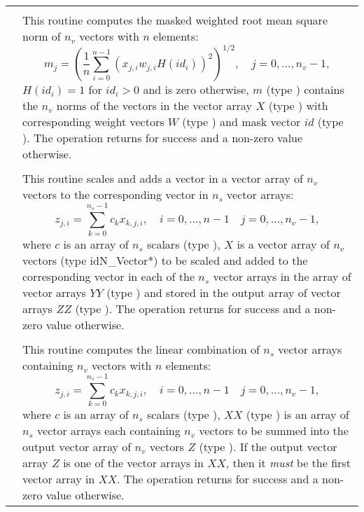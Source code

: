 \begin{xtabular}{|p{\colonec}|p{\coltwoc}|}
 &  \\
& This routine computes the masked weighted root mean square norm of $n_v$
vectors with $n$ elements:
\begin{equation*}
m_j = \left( \frac1n \sum_{i=0}^{n-1} \left(x_{j,i} w_{j,i}
H(id_i)\right)^2 \right)^{1/2}, \quad j=0,\ldots,n_v-1,
\end{equation*}
$H(id_i)=1$ for $id_i > 0$ and is zero otherwise, $m$ (type ) contains
the $n_v$ norms of the vectors in the vector array $X$ (type ) with
corresponding weight vectors $W$ (type ) and mask vector $id$
(type ). The operation returns  for success and a non-zero
value otherwise.
\\[2mm]

 &  \\ 
& This routine scales and adds a vector in a vector array of $n_v$ vectors to
the corresponding vector in $n_s$ vector arrays:
\begin{equation*}
z_{j,i} = \sum_{k=0}^{n_s-1} c_k x_{k,j,i}, \quad i=0,\ldots,n-1 \quad j=0,\ldots,n_v-1,
\end{equation*}
where $c$ is an array of $n_s$ scalars (type ), $X$ is a vector
array of $n_v$ vectors (type id{N\_Vector*}) to be scaled and added to the
corresponding vector in each of the $n_s$ vector arrays in the array of vector
arrays $YY$ (type ) and stored in the output array of vector
arrays $ZZ$ (type ). The operation returns  for success
and a non-zero value otherwise.
\\[2mm]

 &  \\ 
& This routine computes the linear combination of $n_s$ vector arrays containing
$n_v$ vectors with $n$ elements:
\begin{equation*}
z_{j,i} = \sum_{k=0}^{n_s-1} c_k x_{k,j,i}, \quad i=0,\ldots,n-1 \quad j=0,\ldots,n_v-1,
\end{equation*}
where $c$ is an array of $n_s$ scalars (type ), $XX$
(type ) is an array of $n_s$ vector arrays each containing $n_v$
vectors to be summed into the output vector array of $n_v$ vectors $Z$ (type
). If the output vector array $Z$ is one of the vector arrays in
$XX$, then it \textit{must} be the first vector array in $XX$. The operation
returns  for success and a non-zero value otherwise.
\\
\end{xtabular}

